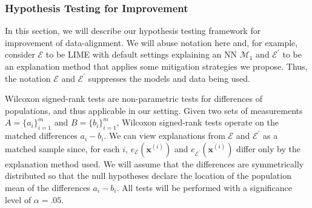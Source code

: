 \documentclass[12pt]{article}  %
\newcommand{\mE}{\mathcal{E}}
\begin{document}
        \subsubsection{Hypothesis Testing for Improvement}
            \label{apx_sec:hypothesis_testing}
            In this section, we will describe our hypothesis testing framework for improvement of data-alignment. We will abuse notation here and, for example, consider $\mE$ to be LIME with default settings explaining an NN $\mathcal{M}_1$ and $\mE^\prime$ to be an explanation method that applies some mitigation strategies we propose. Thus, the notation $\mE$ and $\mE^\prime$ suppresses the models and data being used.
            
            Wilcoxon signed-rank tests are non-parametric tests for differences of populations, and thus applicable in our setting. Given two sets of measurements $A=\{a_i\}_{i=1}^m$ and $B=\{b_i\}_{i=1}^m$, Wilcoxon signed-rank tests operate on the matched differences $a_i-b_i$. We can view explanations from $\mE$ and $\mE^\prime$ as a matched sample since, for each $i$, $e_{\mE}(\mathbf{x}^{(i)})$ and $e_{\mE^\prime}(\mathbf{x}^{(i)})$ differ only by the explanation method used. We will assume that the differences are symmetrically distributed so that the null hypotheses declare the location of the population mean of the differences $a_i - b_i$. All tests will be performed with a significance level of $\alpha=.05$.
\end{document}
